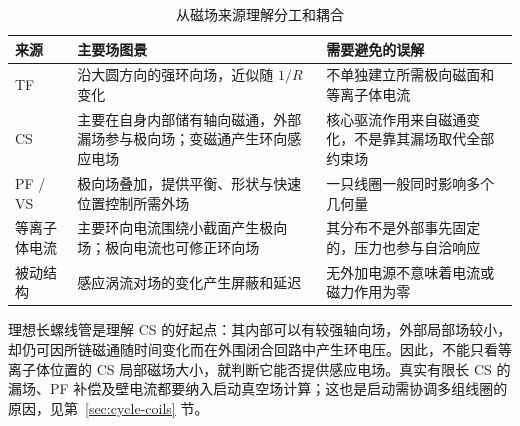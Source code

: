 \documentclass[12pt,fontset=none]{ctexart}
\numberwithin{equation}{section}
\numberwithin{table}{section}
\numberwithin{figure}{section}
\begin{document}
\begin{table}[htbp]
\centering\small
\caption{从磁场来源理解分工和耦合}\label{tab:micro-field-sources}
\begin{tabular}{L{2.0cm}L{5.4cm}L{6.1cm}}
\toprule 来源 & 主要场图景 & 需要避免的误解 \\
\midrule
TF & 沿大圆方向的强环向场，近似随 $1/R$ 变化 & 不单独建立所需极向磁面和等离子体电流 \\
CS & 主要在自身内部储有轴向磁通，外部漏场参与极向场；变磁通产生环向感应电场 & 核心驱流作用来自磁通变化，不是靠其漏场取代全部约束场 \\
PF / VS & 极向场叠加，提供平衡、形状与快速位置控制所需外场 & 一只线圈一般同时影响多个几何量 \\
等离子体电流 & 主要环向电流围绕小截面产生极向场；极向电流也可修正环向场 & 其分布不是外部事先固定的，压力也参与自洽响应 \\
被动结构 & 感应涡流对场的变化产生屏蔽和延迟 & 无外加电源不意味着电流或磁力作用为零 \\
\bottomrule
\end{tabular}
\end{table}

理想长螺线管是理解 CS 的好起点：其内部可以有较强轴向场，外部局部场较小，却仍可因所链磁通随时间变化而在外围闭合回路中产生环电压。因此，不能只看等离子体位置的 CS 局部磁场大小，就判断它能否提供感应电场。真实有限长 CS 的漏场、PF 补偿及壁电流都要纳入启动真空场计算；这也是启动需协调多组线圈的原因，见第~\ref{sec:cycle-coils} 节。
\end{document}
